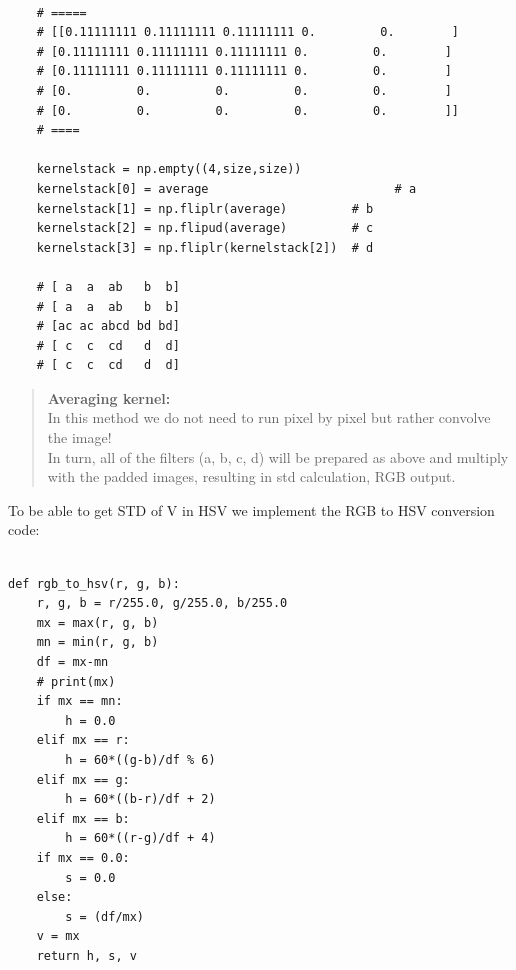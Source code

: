 \documentclass[a4paper,11pt]{article}
\theoremstyle{mytheor}
\begin{document}
\begin{lstlisting}[caption=Averaging Kernel preparation]

    # =====
    # [[0.11111111 0.11111111 0.11111111 0.         0.        ]
    # [0.11111111 0.11111111 0.11111111 0.         0.        ]
    # [0.11111111 0.11111111 0.11111111 0.         0.        ]
    # [0.         0.         0.         0.         0.        ]
    # [0.         0.         0.         0.         0.        ]]
    # ====
    
    kernelstack = np.empty((4,size,size)) 
    kernelstack[0] = average			              # a
    kernelstack[1] = np.fliplr(average)	        # b
    kernelstack[2] = np.flipud(average)	        # c
    kernelstack[3] = np.fliplr(kernelstack[2])	# d
    
    # [ a  a  ab   b  b]
    # [ a  a  ab   b  b]
    # [ac ac abcd bd bd]
    # [ c  c  cd   d  d]
    # [ c  c  cd   d  d]

\end{lstlisting}

\begin{quote}
\textbf{Averaging kernel:\\}
In this method we do not need to run pixel by pixel but rather convolve the image!  \\
In turn, all of the filters (a, b, c, d) will be prepared as above and multiply with the padded images, resulting in std calculation, RGB output.
\end{quote}

To be able to get STD of V in HSV we implement the RGB to HSV conversion code:

\begin{lstlisting}[caption=rgb to hsv]

def rgb_to_hsv(r, g, b):
    r, g, b = r/255.0, g/255.0, b/255.0
    mx = max(r, g, b)
    mn = min(r, g, b)
    df = mx-mn
    # print(mx)
    if mx == mn:
        h = 0.0
    elif mx == r:
        h = 60*((g-b)/df % 6)
    elif mx == g:
        h = 60*((b-r)/df + 2)
    elif mx == b:
        h = 60*((r-g)/df + 4)
    if mx == 0.0:
        s = 0.0
    else:
        s = (df/mx)
    v = mx
    return h, s, v

\end{lstlisting}
\end{document}
